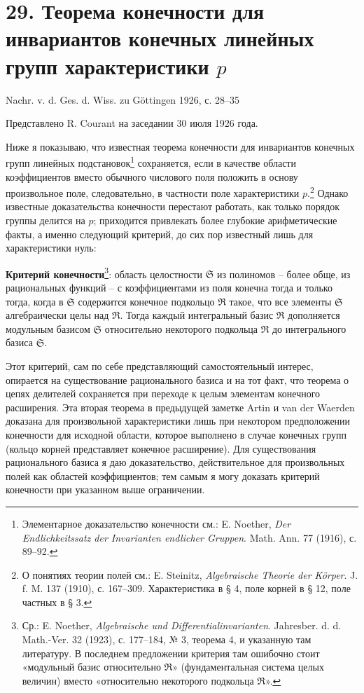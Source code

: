 \documentclass[11pt]{article}
\begin{document}
\section*{29. Теорема конечности для инвариантов конечных линейных групп характеристики $p$}

\begin{center}
Nachr. v. d. Ges. d. Wiss. zu Göttingen 1926, с. 28--35
\end{center}

Представлено R. Courant на заседании 30 июля 1926 года.

Ниже я показываю, что известная теорема конечности для инвариантов конечных групп линейных подстановок\footnote{Элементарное доказательство конечности см.: E. Noether, \emph{Der Endlichkeitssatz der Invarianten endlicher Gruppen}. Math. Ann. 77 (1916), с. 89--92.} сохраняется, если в качестве области коэффициентов вместо обычного числового поля положить в основу произвольное поле, следовательно, в частности поле характеристики $p$.\footnote{О понятиях теории полей см.: E. Steinitz, \emph{Algebraische Theorie der Körper}. J. f. M. 137 (1910), с. 167--309. Характеристика в § 4, поле корней в § 12, поле частных в § 3.} Однако известные доказательства конечности перестают работать, как только порядок группы делится на $p$; приходится привлекать более глубокие арифметические факты, а именно следующий критерий, до сих пор известный лишь для характеристики нуль:

\textbf{Критерий конечности}\footnote{Ср.: E. Noether, \emph{Algebraische und Differentialinvarianten}. Jahresber. d. d. Math.-Ver. 32 (1923), с. 177--184, № 3, теорема 4, и указанную там литературу. В последнем предложении критерия там ошибочно стоит «модульный базис относительно $\mathfrak R$» (фундаментальная система целых величин) вместо «относительно некоторого подкольца $\mathfrak R$».}: область целостности $\mathfrak S$ из полиномов -- более обще, из рациональных функций -- с коэффициентами из поля конечна тогда и только тогда, когда в $\mathfrak S$ содержится конечное подкольцо $\mathfrak R$ такое, что все элементы $\mathfrak S$ алгебраически целы над $\mathfrak R$. Тогда каждый интегральный базис $\mathfrak R$ дополняется модульным базисом $\mathfrak S$ относительно некоторого подкольца $\mathfrak R$ до интегрального базиса $\mathfrak S$.

Этот критерий, сам по себе представляющий самостоятельный интерес, опирается на существование рационального базиса и на тот факт, что теорема о цепях делителей сохраняется при переходе к целым элементам конечного расширения. Эта вторая теорема в предыдущей заметке Artin и van der Waerden доказана для произвольной характеристики лишь при некотором предположении конечности для исходной области, которое выполнено в случае конечных групп (кольцо корней представляет конечное расширение). Для существования рационального базиса я даю доказательство, действительное для произвольных полей как областей коэффициентов; тем самым я могу доказать критерий конечности при указанном выше ограничении.
\end{document}
